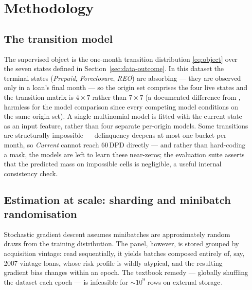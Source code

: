 
\chapter{Methodology}
\label{chap:methodology}

\section{The transition model}
\label{sec:meth-model}

The supervised object is the one-month transition distribution
\eqref{eq:object} over the seven states defined in
Section~\ref{sec:data-outcome}.  In this dataset the terminal states
(\emph{Prepaid}, \emph{Foreclosure}, \emph{REO}) are absorbing ---
they are observed only in a loan's final month --- so the origin set
comprises the four live states and the transition matrix is
$4 \times 7$ rather than $7 \times 7$ (a documented difference from
\citealp{sirignano2021}, harmless for the model comparison since every
competing model conditions on the same origin set).  A single
multinomial model is fitted with the current state as an input
feature, rather than four separate per-origin models.  Some
transitions are structurally impossible --- delinquency deepens at
most one bucket per month, so \emph{Current} cannot reach 60\,DPD
directly --- and rather than hard-coding a mask, the models are left
to learn these near-zeros; the evaluation suite asserts that the
predicted mass on impossible cells is negligible, a useful internal
consistency check.

\section{Estimation at scale: sharding and minibatch randomisation}
\label{sec:meth-shards}

Stochastic gradient descent assumes minibatches are approximately
random draws from the training distribution.  The panel, however, is
stored grouped by acquisition vintage: read sequentially, it yields
batches composed entirely of, say, 2007-vintage loans, whose risk
profile is wildly atypical, and the resulting gradient bias changes
within an epoch.  The textbook remedy --- globally shuffling the
dataset each epoch --- is infeasible for $\sim$$10^9$ rows on external
storage.

